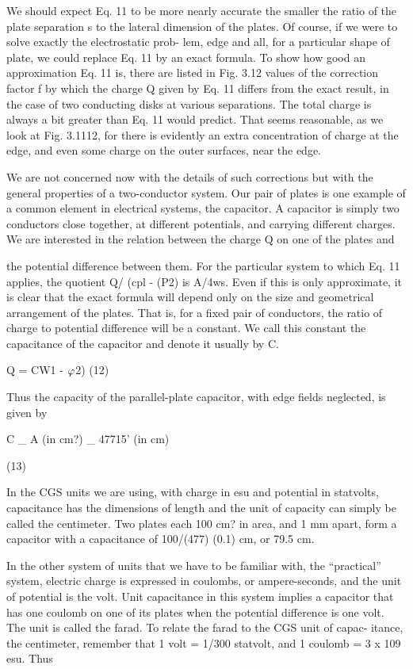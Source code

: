 We should expect Eq. 11 to be more nearly accurate the smaller
the ratio of the plate separation s to the lateral dimension of the
plates. Of course, if we were to solve exactly the electrostatic prob-
lem, edge and all, for a particular shape of plate, we could replace
Eq. 11 by an exact formula. To show how good an approximation
Eq. 11 is, there are listed in Fig. 3.12 values of the correction factor f
by which the charge Q given by Eq. 11 differs from the exact result,
in the case of two conducting disks at various separations. The
total charge is always a bit greater than Eq. 11 would predict. That
seems reasonable, as we look at Fig. 3.1112, for there is evidently an
extra concentration of charge at the edge, and even some charge on
the outer surfaces, near the edge.

We are not concerned now with the details of such corrections but
with the general properties of a two-conductor system. Our pair of
plates is one example of a common element in electrical systems, the
capacitor. A capacitor is simply two conductors close together, at
different potentials, and carrying different charges. We are interested
in the relation between the charge Q on one of the plates and

the potential difference between them. For the particular system
to which Eq. 11 applies, the quotient Q/ (cpl - (P2) is A/4ws. Even
if this is only approximate, it is clear that the exact formula will depend
only on the size and geometrical arrangement of the plates.
That is, for a fixed pair of conductors, the ratio of charge to potential
difference will be a constant. We call this constant the capacitance
of the capacitor and denote it usually by C.

Q = CW1 - $\varphi$2) (12)

Thus the capacity of the parallel-plate capacitor, with edge fields
neglected, is given by

C _ A (in cm?)
_ 47715' (in cm)

(13)

In the CGS units we are using, with charge in esu and potential in
statvolts, capacitance has the dimensions of length and the unit of
capacity can simply be called the centimeter. Two plates each
100 cm? in area, and 1 mm apart, form a capacitor with a capacitance
of 100/(477) (0.1) cm, or 79.5 cm.

In the other system of units that we have to be familiar with, the
``practical'' system, electric charge is expressed in coulombs, or
ampere-seconds, and the unit of potential is the volt. Unit capacitance
in this system implies a capacitor that has one coulomb on
one of its plates when the potential difference is one volt. The unit
is called the farad. To relate the farad to the CGS unit of capac-
itance, the centimeter, remember that 1 volt = 1/300 statvolt, and
1 coulomb = 3 x 109 esu. Thus

